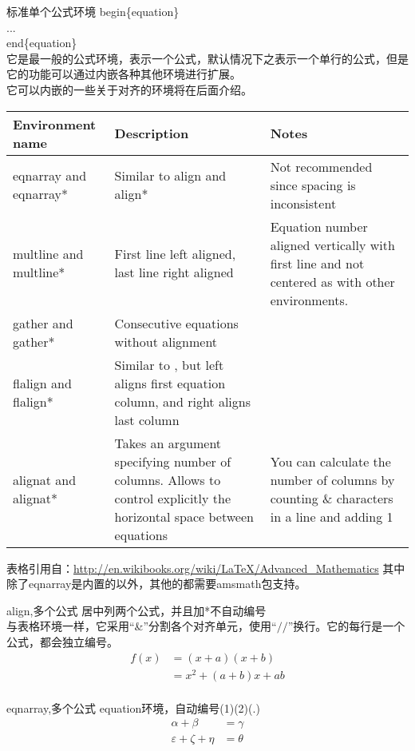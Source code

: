 \begin{frame}{标准单个公式环境}
	begin\{equation\}\\
	...\\
	end\{equation\}\\
	它是最一般的公式环境，表示一个公式，默认情况下之表示一个单行的公式，但是它的功能可以通过内嵌各种其他环境进行扩展。\\
	它可以内嵌的一些关于对齐的环境将在后面介绍。
\end{frame}
	
\begin{frame}[shrink]
	\begin{tabular}{lp{5cm}p{4cm}}
		\hline Environment name &Description &Notes\\
		\hline eqnarray and eqnarray*	&Similar to align and align*	&Not recommended since spacing is inconsistent\\
		\hline multline and multline*	&First line left aligned, last line right aligned	&Equation number aligned vertically with first line and not centered as with other environments.\\
		\hline gather and gather*	&Consecutive equations without alignment&\\	 
		\hline flalign and flalign*	&Similar to {\color{red}{align}}, but left aligns first equation column, and right aligns last column&\\ %
		\hline alignat and alignat*	&Takes an argument specifying number of columns. Allows to control explicitly the horizontal space between equations	&You can calculate the number of columns by counting \& characters in a line and adding 1\\
		\hline
	\end{tabular}
	表格引用自：\url{http://en.wikibooks.org/wiki/LaTeX/Advanced\_Mathematics}
	其中除了eqnarray是内置的以外，其他的都需要amsmath包支持。
	\end{frame}


\begin{frame}{align,多个公式}
	居中列两个公式，并且加*不自动编号\\
	与表格环境一样，它采用“\&”分割各个对齐单元，使用“$// $”换行。它的每行是一个公式，都会独立编号。
	\begin{align*}
		f(x) &= (x+a)(x+b) \\
			 &= x^2 + (a+b)x + ab\\
	\end{align*}
\end{frame}

\begin{frame}{eqnarray,多个公式}
	equation环境，自动编号(1)(2)(.)
	\begin{eqnarray}
	\alpha+\beta &=\gamma\\
	\varepsilon+\zeta+\eta &=\theta%
	\end{eqnarray}
\end{frame}

